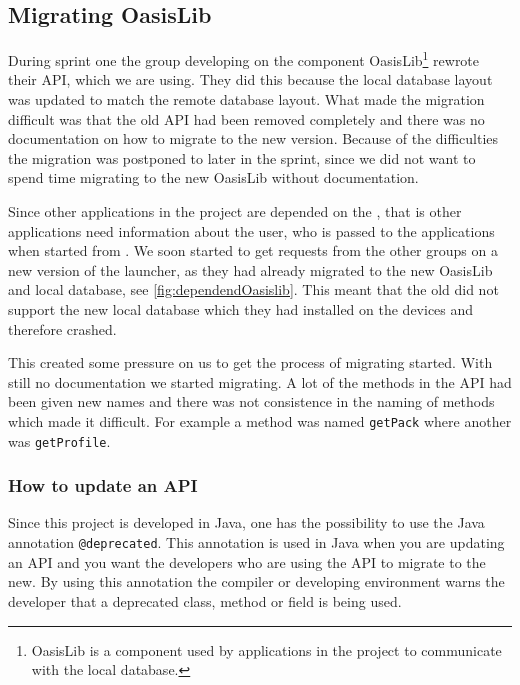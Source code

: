 \subsection{Migrating OasisLib}\label{sec:oasismigration}
During sprint one the group developing on the component OasisLib\footnote{OasisLib is a component used by applications in the \giraf project to communicate with the local database.} rewrote their API, which we are using.
They did this because the local database layout was updated to match the remote database layout.
What made the migration difficult was that the old API had been removed completely and there was no documentation on how to migrate to the new version.
Because of the difficulties the migration was postponed to later in the sprint, since we did not want to spend time migrating to the new OasisLib without documentation.

Since other applications in the \giraf project are depended on the \launcher, that is other applications need information about the user, who is passed to the applications when started from \launcher.
We soon started to get requests from the other groups on a new version of the launcher, as they had already migrated to the new OasisLib and local database, see \cref{fig:dependendOasislib}.
This meant that the old \launcher did not support the new local database which they had installed on the devices and therefore crashed.


This created some pressure on us to get the process of migrating started.
With still no documentation we started migrating. A lot of the methods in the API had been given new names and there was not consistence in the naming of methods which made it difficult.
For example a method was named \lstinline{getPack} where another was \lstinline{getProfile}.

\subsubsection*{How to update an API}
Since this project is developed in Java, one has the possibility to use the Java annotation \lstinline{@deprecated}.
This annotation is used in Java when you are updating an API and you want the developers who are using the API to migrate to the new.
By using this annotation the compiler or developing environment warns the developer that a deprecated class, method or field is being used.

